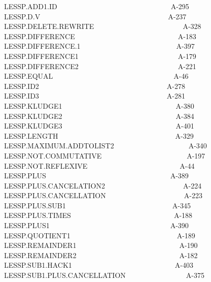 \documentclass[11pt]{book}
\newenvironment{pubasis}{\begin{flushleft}\ttfamily\small}{\normalsize\rmfamily\end{flushleft}}
\begin{document}
\begin{pubasis}
LESSP.ADD1.ID~~~~~~~~~~~~~~~~~~~~~~~~~~~~~~~~A-295\\
LESSP.D.V~~~~~~~~~~~~~~~~~~~~~~~~~~~~~~~~~~~~A-237\\
LESSP.DELETE.REWRITE~~~~~~~~~~~~~~~~~~~~~~~~~A-328\\
LESSP.DIF\-FER\-ENCE~~~~~~~~~~~~~~~~~~~~~~~~~~~~~A-183\\
LESSP.DIF\-FER\-ENCE.1~~~~~~~~~~~~~~~~~~~~~~~~~~~A-397\\
LESSP.DIF\-FER\-ENCE1~~~~~~~~~~~~~~~~~~~~~~~~~~~~A-179\\
LESSP.DIF\-FER\-ENCE2~~~~~~~~~~~~~~~~~~~~~~~~~~~~A-221\\
LESSP.EQUAL~~~~~~~~~~~~~~~~~~~~~~~~~~~~~~~~~~A-46\\
LESSP.ID2~~~~~~~~~~~~~~~~~~~~~~~~~~~~~~~~~~~~A-278\\
LESSP.ID3~~~~~~~~~~~~~~~~~~~~~~~~~~~~~~~~~~~~A-281\\
LESSP.KLUDGE1~~~~~~~~~~~~~~~~~~~~~~~~~~~~~~~~A-380\\
LESSP.KLUDGE2~~~~~~~~~~~~~~~~~~~~~~~~~~~~~~~~A-384\\
LESSP.KLUDGE3~~~~~~~~~~~~~~~~~~~~~~~~~~~~~~~~A-401\\
LESSP.LENGTH~~~~~~~~~~~~~~~~~~~~~~~~~~~~~~~~~A-329\\
LESSP.MAX\-I\-MUM.ADD\-TO\-LIST2~~~~~~~~~~~~~~~~~~~~~A-340\\
LESSP.NOT.COMMUTATIVE~~~~~~~~~~~~~~~~~~~~~~~~A-197\\
LESSP.NOT.REFLEXIVE~~~~~~~~~~~~~~~~~~~~~~~~~~A-44\\
LESSP.PLUS~~~~~~~~~~~~~~~~~~~~~~~~~~~~~~~~~~~A-389\\
LESSP.PLUS.CANCELATION2~~~~~~~~~~~~~~~~~~~~~~A-224\\
LESSP.PLUS.CAN\-CELLATION~~~~~~~~~~~~~~~~~~~~~~A-223\\
LESSP.PLUS.SUB1~~~~~~~~~~~~~~~~~~~~~~~~~~~~~~A-345\\
LESSP.PLUS.TIMES~~~~~~~~~~~~~~~~~~~~~~~~~~~~~A-188\\
LESSP.PLUS1~~~~~~~~~~~~~~~~~~~~~~~~~~~~~~~~~~A-390\\
LESSP.QUOTIENT1~~~~~~~~~~~~~~~~~~~~~~~~~~~~~~A-189\\
LESSP.REMAINDER1~~~~~~~~~~~~~~~~~~~~~~~~~~~~~A-190\\
LESSP.REMAINDER2~~~~~~~~~~~~~~~~~~~~~~~~~~~~~A-182\\
LESSP.SUB1.HACK1~~~~~~~~~~~~~~~~~~~~~~~~~~~~~A-403\\
LESSP.SUB1.PLUS.CAN\-CELLATION~~~~~~~~~~~~~~~~~A-375\\

\end{pubasis}
\end{document}
